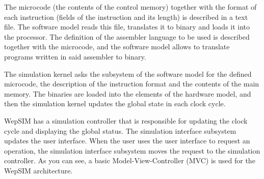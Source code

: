 The microcode (the contents of the control memory) together with the format of each instruction (fields of the instruction and its length) is described in a text file. The software model reads this file, translates it to binary and loads it into the processor. The definition of the assembler language to be used is described together with the microcode, and the software model allows to translate programs written in said assembler to binary.


The simulation kernel asks the subsystem of the software model for the defined microcode, the description of the instruction format and the contents of the main memory. The binaries are loaded into the elements of the hardware model, and then the simulation kernel updates the global state in each clock cycle.

WepSIM has a simulation controller that is responsible for updating the clock cycle and displaying the global status. The simulation interface subsystem updates the user interface. When the user uses the user interface to request an operation, the simulation interface subsystem moves the request to the simulation controller. As you can see, a basic Model-View-Controller (MVC) is used for the WepSIM architecture.